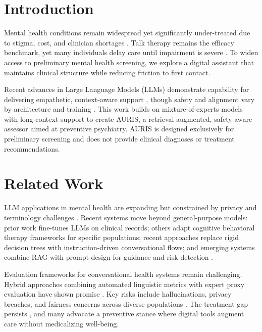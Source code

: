 \documentclass[sigconf]{acmart}
\begin{document}
\section{Introduction}

Mental health conditions remain widespread yet significantly under-treated due to stigma, cost, and clinician shortages \cite{wren2021,zhao2025}. Talk therapy remains the efficacy benchmark, yet many individuals delay care until impairment is severe \cite{ncheke2024}. To widen access to preliminary mental health screening, we explore a digital assistant that maintains clinical structure while reducing friction to first contact.

Recent advances in Large Language Models (LLMs) demonstrate capability for delivering empathetic, context-aware support \cite{hua2024,jin2025,guo2024}, though safety and alignment vary by architecture and training \cite{lawrence2024}. This work builds on mixture-of-experts models with long-context support \cite{meta2025,meta2026} to create AURIS, a retrieval-augmented, safety-aware assessor aimed at preventive psychiatry. AURIS is designed exclusively for preliminary screening and does not provide clinical diagnoses or treatment recommendations.

\section{Related Work}

LLM applications in mental health are expanding but constrained by privacy and terminology challenges \cite{hua2024,jin2025}. Recent systems move beyond general-purpose models: prior work fine-tunes LLMs on clinical records; others adapt cognitive behavioral therapy frameworks for specific populations; recent approaches replace rigid decision trees with instruction-driven conversational flows; and emerging systems combine RAG with prompt design for guidance and risk detection \cite{lewis2020}.

Evaluation frameworks for conversational health systems remain challenging. Hybrid approaches combining automated linguistic metrics with expert proxy evaluation have shown promise \cite{zhou2023}. Key risks include hallucinations, privacy breaches, and fairness concerns across diverse populations \cite{lawrence2024}. The treatment gap persists \cite{zhao2025}, and many advocate a preventive stance where digital tools augment care without medicalizing well-being.
\end{document}
